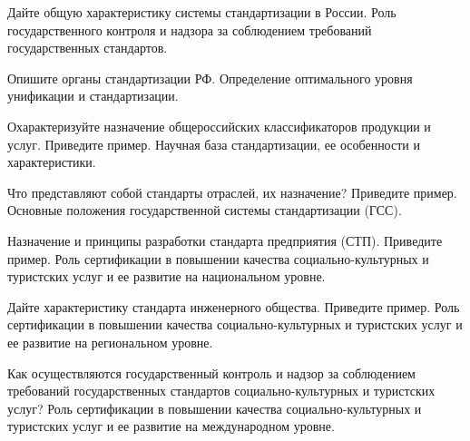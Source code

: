 \documentclass[
	14pt,
	a4paper,
	]
	{scrartcl}
\begin{document}
\vfill
\z Дайте общую характеристику системы стандартизации в России.
 \vfill
\z Роль государственного контроля и надзора за соблюдением требований государственных стандартов.
 \vfill

\vfill

\newpage


\shapk
{}
\setcounter{zad}{0}

\vfill
\z Опишите органы стандартизации РФ.
 \vfill
\z Определение оптимального уровня унификации и стандартизации.
 \vfill

\vfill

\newpage


\shapk
{}
\setcounter{zad}{0}

\vfill
\z Охарактеризуйте назначение общероссийских классификаторов продукции и услуг. Приведите пример.
 \vfill
\z Научная база стандартизации, ее особенности и характеристики.
 \vfill

\vfill

\newpage


\shapk
{}
\setcounter{zad}{0}

\vfill
\z Что представляют собой стандарты отраслей, их назначение? Приведите пример.
 \vfill
\z Основные положения государственной системы стандартизации (ГСС).
 \vfill

\vfill

\newpage


\shapk
{}
\setcounter{zad}{0}

\vfill
\z Назначение и принципы разработки стандарта предприятия (СТП). Приведите пример.
 \vfill
\z Роль сертификации в повышении качества социально-культурных и туристских услуг и ее развитие на национальном уровне.
 \vfill

\vfill

\newpage


\shapk
{}
\setcounter{zad}{0}

\vfill
\z Дайте характеристику стандарта инженерного общества. Приведите пример.
 \vfill
\z Роль сертификации в повышении качества социально-культурных и туристских услуг и ее развитие на региональном уровне.
 \vfill

\vfill

\newpage


\shapk
{}
\setcounter{zad}{0}

\vfill
\z Как осуществляются государственный контроль и надзор за соблюдением требований государственных стандартов социально-культурных и туристских услуг?
 \vfill
\z Роль сертификации в повышении качества социально-культурных и туристских услуг и ее развитие на международном уровне.
 \vfill
\end{document}

